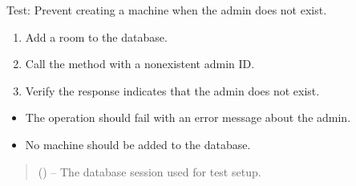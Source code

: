 \documentclass[letterpaper,10pt,english]{sphinxmanual}
\begin{document}
\begin{fulllineitems}
\label{\detokenize{test:test.test_machine.test_create_machine_admin_not_exist}}
\pysigstartsignatures
\pysiglinewithargsret
{}
{}
{}
\pysigstopsignatures
\sphinxAtStartPar
Test: Prevent creating a machine when the admin does not exist.
\begin{description}
\begin{enumerate}
%
\item {} 
\sphinxAtStartPar
Add a room to the database.

\item {} 
\sphinxAtStartPar
Call the  method with a nonexistent admin ID.

\item {} 
\sphinxAtStartPar
Verify the response indicates that the admin does not exist.

\end{enumerate}

\begin{itemize}
\item {} 
\sphinxAtStartPar
The operation should fail with an error message about the admin.

\item {} 
\sphinxAtStartPar
No machine should be added to the database.

\end{itemize}

\end{description}
\begin{quote}\begin{description}
\sphinxAtStartPar
{} () – The database session used for test setup.

\end{description}\end{quote}

\end{fulllineitems}

\end{document}
